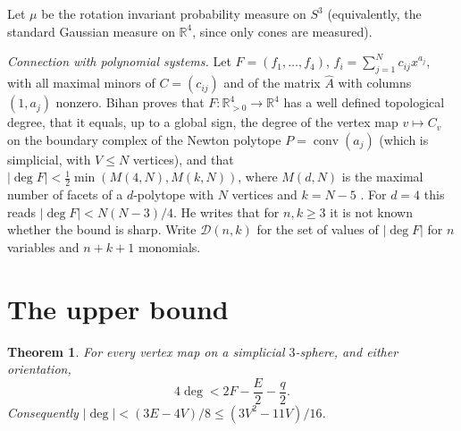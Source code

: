 \documentclass[11pt]{article}
\newtheorem{theorem}{Theorem}
\theoremstyle{remark}
\newcommand{\R}{\mathbb{R}}
\begin{document}
Let $\mu$ be the rotation invariant probability measure on $S^3$ (equivalently, the standard Gaussian measure on $\R^4$, since only cones are measured).

\medskip\noindent\emph{Connection with polynomial systems.} Let $F=(f_1,\dots,f_4)$, $f_i=\sum_{j=1}^Nc_{ij}x^{a_j}$, with all maximal minors of $C=(c_{ij})$ and of the matrix $\hat A$ with columns $(1,a_j)$ nonzero. Bihan \cite{D,B} proves that $F\colon\R^4_{>0}\to\R^4$ has a well defined topological degree, that it equals, up to a global sign, the degree of the vertex map $v\mapsto C_v$ on the boundary complex of the Newton polytope $P=\operatorname{conv}(a_j)$ (which is simplicial, with $V\le N$ vertices), and that $|\deg F|<\tfrac12\min(M(4,N),M(k,N))$, where $M(d,N)$ is the maximal number of facets of a $d$-polytope with $N$ vertices and $k=N-5$ \cite[Thm.~2]{B}. For $d=4$ this reads $|\deg F|<N(N-3)/4$. He writes that for $n,k\ge3$ it is not known whether the bound is sharp. Write $\mathcal D(n,k)$ for the set of values of $|\deg F|$ for $n$ variables and $n+k+1$ monomials.

\section{The upper bound}

\begin{theorem}\label{thm:M}
For every vertex map on a simplicial $3$-sphere, and either orientation,
\[
4\deg<2F-\frac E2-\frac q2 .
\]
Consequently $|\deg|<(3E-4V)/8\le(3V^2-11V)/16$.
\end{theorem}
\end{document}
